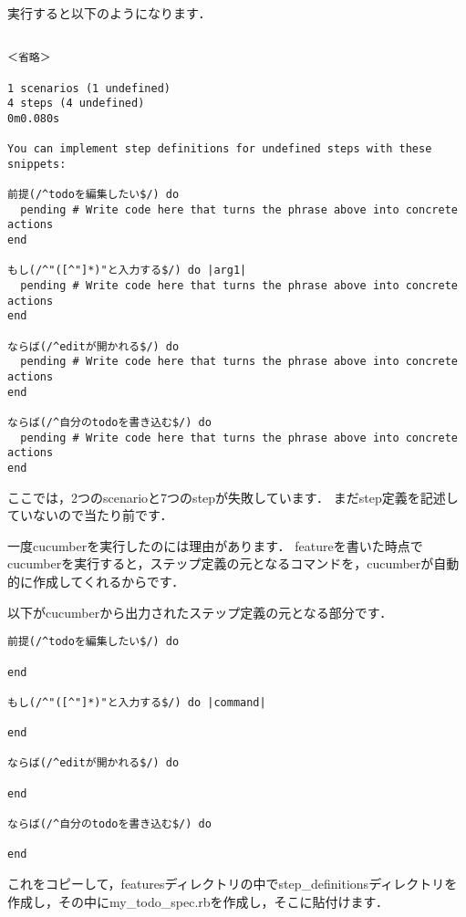実行すると以下のようになります．
\begin{lstlisting}[style=customCsh]

＜省略＞

1 scenarios (1 undefined)
4 steps (4 undefined)
0m0.080s

You can implement step definitions for undefined steps with these snippets:

前提(/^todoを編集したい$/) do
  pending # Write code here that turns the phrase above into concrete actions
end

もし(/^"([^"]*)"と入力する$/) do |arg1|
  pending # Write code here that turns the phrase above into concrete actions
end

ならば(/^editが開かれる$/) do
  pending # Write code here that turns the phrase above into concrete actions
end

ならば(/^自分のtodoを書き込む$/) do
  pending # Write code here that turns the phrase above into concrete actions
end
\end{lstlisting}
ここでは，2つのscenarioと7つのstepが失敗しています．
まだstep定義を記述していないので当たり前です．

一度cucumberを実行したのには理由があります．
featureを書いた時点でcucumberを実行すると，ステップ定義の元となるコマンドを，cucumberが自動的に作成してくれるからです．

以下がcucumberから出力されたステップ定義の元となる部分です．
\begin{lstlisting}[style=customCsh]
前提(/^todoを編集したい$/) do

end

もし(/^"([^"]*)"と入力する$/) do |command|

end

ならば(/^editが開かれる$/) do
  
end

ならば(/^自分のtodoを書き込む$/) do

end
\end{lstlisting}
これをコピーして，featuresディレクトリの中でstep\_definitionsディレクトリを作成し，その中にmy\_todo\_spec.rbを作成し，そこに貼付けます．

